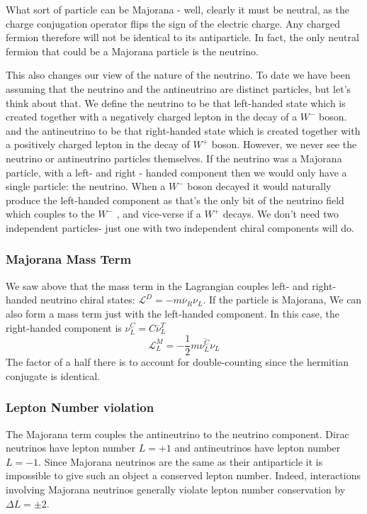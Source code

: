 What sort of particle can be Majorana - well, clearly it must be neutral, as the charge conjugation operator flips the sign of the electric charge. Any charged fermion therefore will not be identical to its antiparticle. In fact, the only neutral fermion that could be a Majorana particle is the neutrino.

This also changes our view of the nature of the neutrino. To date we have been assuming that the neutrino and the antineutrino are distinct particles, but let’s think about that. We define the neutrino to be that left-handed state which is created together with a negatively charged lepton in the decay of a \(W^-\) boson. and the antineutrino to be that right-handed state which is created together with a positively charged lepton in the decay of \(W^+\) boson. However, we never see the neutrino or antineutrino particles themselves. If the neutrino was a Majorana particle, with a left- and right - handed component then we would only have a single particle: the neutrino. When a \(W^-\) boson decayed it would naturally produce the left-handed component as that’s the only bit of the neutrino field which couples to the \(W^-\) , and vice-verse if a \(W^+\) decays. We don't need two independent particles- just one with two independent chiral components will do.

\subsubsection{Majorana Mass Term}
We saw above that the mass term in the Lagrangian couples left- and right-handed neutrino chiral states: \(\mathcal{L}^D = - m \overline {\nu}_R \nu _L\). If the particle is Majorana, We can also form a mass term just with the left-handed component. In this case, the right-handed component is \(\nu _L ^C = C \overline {\nu}_L^T\)
\begin{equation}
    \mathcal{L}^M _L = -\frac{1}{2} m \overline {\nu ^C _L} \nu _L
\end{equation}
The factor of a half there is to account for double-counting since the hermitian conjugate is identical.
\subsubsection{Lepton Number violation} 
The Majorana term couples the antineutrino to the neutrino component. Dirac neutrinos have lepton number $L = +1$ and antineutrinos have lepton number $L = -1$. Since Majorana neutrinos are the same as their antiparticle it is impossible to give such an object a conserved lepton number. Indeed, interactions involving Majorana neutrinos generally violate lepton number conservation by \(\Delta L = \pm 2\).

